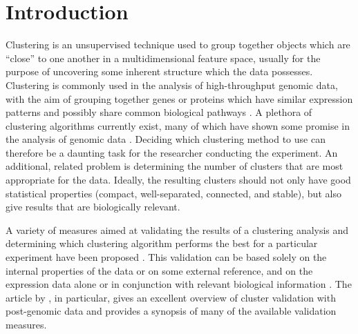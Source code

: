 \documentclass[11pt]{article}
\begin{document}





\section{Introduction}
\label{sec:introduction}

Clustering is an unsupervised technique used to group together objects which
are ``close'' to one another in a multidimensional feature space,
usually for the purpose of uncovering some inherent structure
which the data possesses.    
Clustering is commonly used in the
analysis of high-throughput genomic data, with the aim of 
grouping together genes or proteins which have similar
expression patterns and possibly share common biological pathways
\citep{DeR1997,Chu1998,Eis1998,Bha2007}. 
A plethora of clustering algorithms currently exist, many of which
have shown some promise in the analysis of genomic data \citep{Her2001,McL2002,Dem2003,Fu2007}.  
Deciding which clustering method to use can therefore be a
daunting task for the researcher conducting the experiment.  
An additional, related problem is determining the number of clusters
that are most appropriate for the data.  Ideally, the resulting clusters should
not only have good statistical properties (compact, well-separated,
connected, and stable), but also
give results that are biologically relevant.

A variety of measures aimed at validating the
results of a clustering analysis and determining which clustering
algorithm performs the best for a particular experiment have been
proposed \citep{Ker2001, Yeu2001, Dat2003}.  This validation can be based solely on the internal properties
of the data or on some external reference, and on the expression data
alone or in conjunction with relevant biological information
\citep{Gib2002, Gat2003, Bol2005, Dat2006}.  The article by
\citet{Han2005}, in particular, gives an excellent overview of cluster
validation with post-genomic data and provides a synopsis of many of
the available validation measures. 
\end{document}
